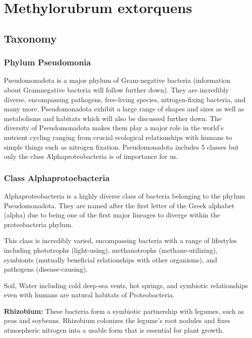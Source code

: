 \chapter{Methylorubrum extorquens\authorB{}}

\section{{Taxonomy}}

\subsection{Phylum Pseudomonia}
Pseudomonadota is a major phylum of Gram-negative bacteria (information about Gramnegative bacteria will follow further down). They are incredibly diverse, encompassing
pathogens, free-living species, nitrogen-fixing bacteria, and many more.
Pseudomonadota exhibit a large range of shapes and sizes as well as metabolisms and
habitats which will also be discussed further down. The diversity of Pseudomonadota
makes them play a major role in the world's nutrient cycling ranging from crucial
ecological relationships with humans to simple things such as nitrogen fixation.
Pseudomonadota includes 5 classes but only the class Alphaproteobacteria is of
importance for us.

\subsection{Class Alphaprotoebacteria}
Alphaproteobacteria is a highly diverse class of bacteria belonging to the phylum
Pseudomonadota.
They are named after the first letter of the Greek alphabet (alpha) due
to being one of the first major lineages to diverge within the proteobacteria phylum.

This class is incredibly varied, encompassing bacteria with a range of lifestyles including
phototrophs (light-using), methanotrophs (methane-utilizing), symbionts (mutually
beneficial relationships with other organisms), and pathogens (disease-causing).

Soil, Water including cold deep-sea vents, hot springs, and symbiotic relationships even
with humans are natural habitats of Proteobacteria.

\textbf{Rhizobium:} These bacteria form a symbiotic partnership with legumes, such as peas and
soybeans.
Rhizobium colonizes the legume's root nodules and fixes atmospheric nitrogen
into a usable form that is essential for plant growth.

